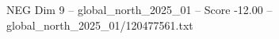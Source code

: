 \begin{textsample}{NEG Dim 9 – global\_north\_2025\_01 – Score -12.00 – global\_north\_2025\_01/120477561.txt}
\end{textsample}
